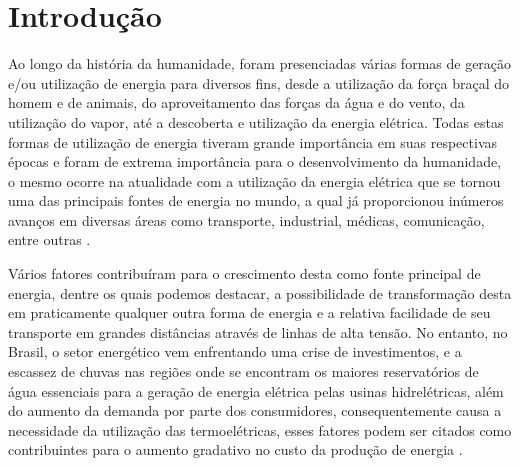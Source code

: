 
\chapter[Introdução]{Introdução}

Ao longo da história da humanidade, foram presenciadas várias formas de geração e/ou utilização de energia para diversos fins, desde a utilização da força braçal do homem e de animais, do aproveitamento das forças da água e do vento, da utilização do vapor, até a descoberta e utilização da energia elétrica. Todas estas formas de utilização de energia tiveram grande importância em suas respectivas épocas e foram de extrema importância para o desenvolvimento da humanidade, o mesmo ocorre na atualidade com a utilização da energia elétrica que se tornou uma das principais fontes de energia no mundo, a qual já proporcionou inúmeros avanços em diversas áreas como transporte, industrial, médicas, comunicação, entre outras \cite{jones1991electrical}.

Vários fatores contribuíram para o crescimento desta como fonte principal de energia, dentre os quais podemos destacar, a possibilidade de transformação desta em praticamente qualquer outra forma de energia e a relativa facilidade de seu transporte em grandes distâncias através de linhas de alta tensão. No entanto, no Brasil, o setor energético vem enfrentando uma crise de investimentos, e a escassez de chuvas nas regiões onde se encontram os maiores reservatórios de água essenciais para a geração de energia elétrica pelas usinas hidrelétricas, além do aumento da demanda por parte dos consumidores, consequentemente causa a necessidade da utilização das termoelétricas, esses fatores podem ser citados como contribuintes para o aumento gradativo no custo da produção de energia \cite[p. 11]{alissonUTFPR2016}. 



